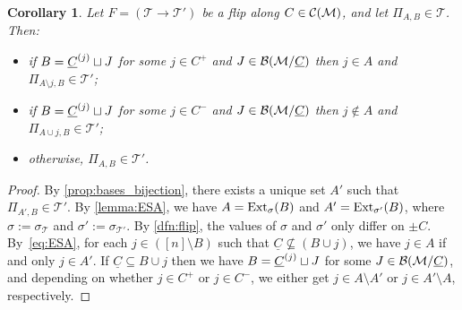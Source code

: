 \documentclass[11pt]{amsart}
\theoremstyle{plain}
\newtheorem{corollary}[theorem]{Corollary}
\theoremstyle{definition}
\def\Tcal{\mathcal{T}}
\def\suppC{{\underline{C}}}
\def\Tiling{\Tcal}
\def\tile{\Pi}
\def\eltminus{\setminus}
\let\subset\subseteq
\begin{document}
\begin{corollary}\label{cor:flip_tiles}
Let $F=(\Tiling\to\Tiling')$ be a flip along $C\in\mathcal{C}(\mathcal{M})$, and let $\tile_{A,B}\in\Tiling$. Then:
\begin{itemize}
\item if $B=\sC^j\sqcup J$ for some $j\in C^+$ and $J\in\BMC$ then $j\in A$ and $\tile_{A\eltminus j,B}\in\Tiling'$;
\item if $B=\sC^j\sqcup J$ for some $j\in C^-$ and $J\in\BMC$ then $j\notin A$ and $\tile_{A\cup j,B}\in\Tiling'$;
\item otherwise, $\tile_{A,B}\in\Tiling'$.
\end{itemize}
\end{corollary}
\begin{proof}
By \cref{prop:bases_bijection}, there exists a unique set $A'$ such that $\tile_{A',B}\in\Tiling'$. By \cref{lemma:ESA}, we have $A=\operatorname{Ext}_{\sigma}(B)$ and $A'=\ExtXX_{\sigma'}(B)$, where 
	$\sigma:=\sigma_\Tiling$ and $\sigma':=\sigma_{\Tiling'}$. 
	By \cref{dfn:flip}, the values of 
	$\sigma$ and $\sigma'$ 
	only differ on $\pm C$. By~\eqref{eq:ESA}, for each $j\in ([n]\setminus B)$ such that $\suppC\not\subset (B\cup j)$, we have $j\in A$ if and only $j\in A'$. If $\suppC\subset B\cup j$ then we have $B=\sC^j\sqcup J$ for some $J\in \BMC$, and depending on whether $j\in C^+$ or $j\in C^-$, we either get $j\in A\setminus A'$ or $j\in A'\setminus A$, respectively.
\end{proof}
\end{document}
